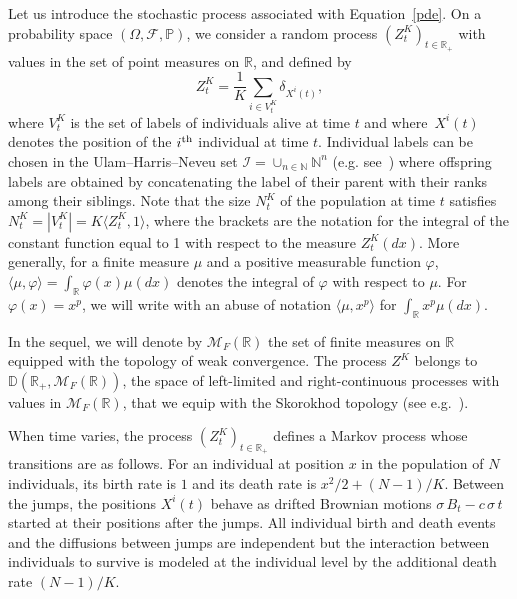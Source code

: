 \documentclass[AHL,Unicode,longabstracts,published]{cedram}
\newcommand{\Fo}{\mathcal{F}}
\newcommand{\Io}{\mathcal{I}}
\newcommand{\Mo}{\mathcal{M}}
\newcommand*\D{\mathbb{D}}
\newcommand*\N{\mathbb{N}}
\renewcommand*\P{\mathbb{P}}
\newcommand*\R{\mathbb{R}}
\begin{document}
Let us introduce the stochastic process associated with Equation~\eqref{pde}. On a probability space $(\Omega,\Fo,\P)$, we consider a random process $(Z^{K}_{t})_{t\in \R_{+}}$ with values in the set of point measures on $\R$, and defined by
\begin{equation}
Z^{K}_{t} = \frac{1}{K} \sum_{i\in V^K_t} \delta_{X^i(t)},\label{def:ZK}
\end{equation}
where $V^K_t$ is the set of labels of individuals alive at time $t$ and where $\,X^i(t)$ denotes the position of the $i^{\rm th}$ individual at time $t$. Individual labels can be chosen in the Ulam--Harris--Neveu set $ \Io = \cup_{n\in\N}\N^n$ (e.g. see~\cite{legall}) where offspring labels are obtained by concatenating the label of their parent with their ranks among their siblings. Note that the size $N^K_t$ of the population at time $t$ satisfies $N^K_t= |V^K_t|=K \langle Z^{K}_t,1\rangle$, where the brackets are the notation for the integral of the constant function equal to 1 with respect to the measure $Z^K_t(dx)$. More generally, for a finite measure $\mu$ and a positive measurable function $\varphi$, $\langle \mu, \varphi\rangle=\int_{\R}\varphi(x)\mu(dx)$ denotes the integral of $\varphi$ with respect to $\mu$. For $\varphi(x)=x^p$, we will write with an abuse of notation $\langle \mu, x^p\rangle$ for $\int_\R x^p \mu(dx)$.

In the sequel, we will denote by $\Mo_{F}(\R)$ the set of finite measures on $\R$ equipped with the topology of weak convergence. The process $Z^K$ belongs to $\D(\R_+,\Mo_{F}(\R))$, the space of left-limited and right-continuous processes with values in $\Mo_{F}(\R)$, that we equip with the Skorokhod topology (see e.g.~\cite{billingsley_convergence_1999}).

When time varies, the process $(Z^{K}_{t})_{t \in\R_{+}}$ defines a Markov process whose transitions are as follows. For an individual at position $x$ in the population of $N$ individuals, its birth rate is $1$ and its death rate is $x^2/2 + (N-1)/K$. Between the jumps, the positions $X^i(t)$ behave as drifted Brownian motions $\sigma\,B_{t}- c\,\sigma\,t$ started at their positions after the jumps. All individual birth and death events and the diffusions between jumps are independent but the interaction between individuals to survive is modeled at the individual level by the additional death rate $(N-1)/K$.
\end{document}
